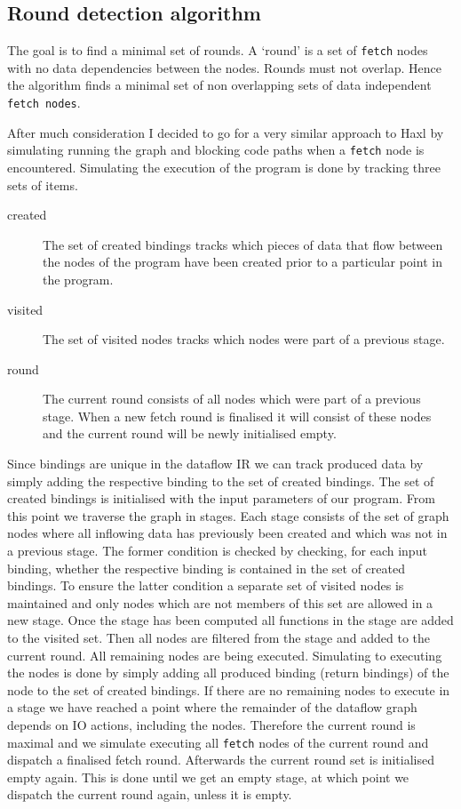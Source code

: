 \subsection{Round detection algorithm}

The goal is to find a minimal set of rounds.
A `round' is a set of \texttt{fetch} nodes with no data dependencies between the nodes.
Rounds must not overlap.
Hence the algorithm finds a minimal set of non overlapping sets of data independent \texttt{fetch nodes}.

After much consideration I decided to go for a very similar approach to Haxl by simulating running the graph and blocking code paths when a \texttt{fetch} node is encountered.
Simulating the execution of the program is done by tracking three sets of items.

\begin{description}
	\item[created] The set of created bindings tracks which pieces of data that flow between the nodes of the program have been created prior to a particular point in the program.
	\item[visited] The set of visited nodes tracks which nodes were part of a previous stage.
	\item[round] The current round consists of all \fetch{} nodes which were part of a previous stage.
	When a new fetch round is finalised it will consist of these \fetch{} nodes and the current round will be newly initialised empty.
\end{description}

Since bindings are unique in the dataflow IR we can track produced data by simply adding the respective binding to the set of created bindings.
The set of created bindings is initialised with the input parameters of our program.
From this point we traverse the graph in stages.
Each stage consists of the set of graph nodes where all inflowing data has previously been created and which was not in a previous stage.
The former condition is checked by checking, for each input binding, whether the respective binding is contained in the set of created bindings.
To ensure the latter condition a separate set of visited nodes is maintained and only nodes which are not members of this set are allowed in a new stage.
Once the stage has been computed all functions in the stage are added to the visited set.
Then all \fetch{} nodes are filtered from the stage and added to the current round.
All remaining nodes are being executed.
Simulating to executing the nodes is done by simply adding all produced binding (return bindings) of the node to the set of created bindings.
If there are no remaining nodes to execute in a stage we have reached a point where the remainder of the dataflow graph depends on IO actions, including the \fetch{} nodes.
Therefore the current round is maximal and we simulate executing all \texttt{fetch} nodes of the current round and dispatch a finalised fetch round.
Afterwards the current round set is initialised empty again.
This is done until we get an empty stage, at which point we dispatch the current round again, unless it is empty.

